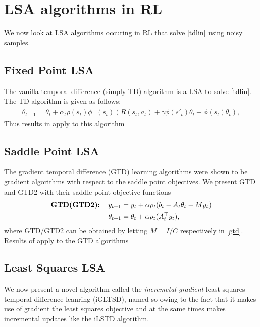 \section{LSA algorithms in RL}
We now look at LSA algorithms occuring in RL that solve \eqref{tdlin} using noisy samples.
\subsection{Fixed Point LSA}
The vanilla temporal difference (simply TD) algorithm is a LSA to solve \eqref{tdlin}. The TD algorithm is given as follows:
\begin{align}\label{vtd}
\theta_{t+1}=\theta_t+\alpha_t \rho(s_t)\phi^\top(s_t)(R(s_t,a_t)+\gamma \phi(s'_t)\theta_t- \phi(s_t)\theta_t),
\end{align}
Thus results in  apply to this algorithm
\subsection{Saddle Point LSA}
The gradient temporal difference (GTD) learning algorithms were shown to be gradient algorithms with respect to the saddle point objectives. We present GTD and GTD2 with their saddle point objective functions
\begin{align}\label{gtd}
\begin{split}
\textbf{GTD(GTD2):\quad}y_{t+1}&=y_t+\alpha \rho_t(b_t-A_t\theta_t - M y_t)\\
\theta_{t+1}&=\theta_t+\alpha\rho_t(A^\top_ty_t),
\end{split}
\end{align}
where GTD/GTD2 can be obtained by letting $M=I/C$ respectively in \eqref{gtd}. Results of  apply to the GTD algorithms
\subsection{Least Squares LSA}
We now present a novel algorithm called the \emph{incremetal-gradient} least squares temporal difference leanring (iGLTSD), named so owing to the fact that it makes use of gradient the least squares objective and at the same times makes incremental updates like the iLSTD algorithm.

